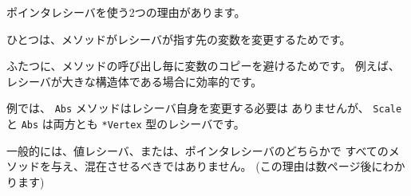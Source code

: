 ポインタレシーバを使う2つの理由があります。

ひとつは、メソッドがレシーバが指す先の変数を変更するためです。

ふたつに、メソッドの呼び出し毎に変数のコピーを避けるためです。 
例えば、レシーバが大きな構造体である場合に効率的です。

例では、 \texttt{Abs} メソッドはレシーバ自身を変更する必要は
ありませんが、 \texttt{Scale} と \texttt{Abs} は両方とも 
\texttt{*Vertex} 型のレシーバです。

一般的には、値レシーバ、または、ポインタレシーバのどちらかで
すべてのメソッドを与え、混在させるべきではありません。 
(この理由は数ページ後にわかります)